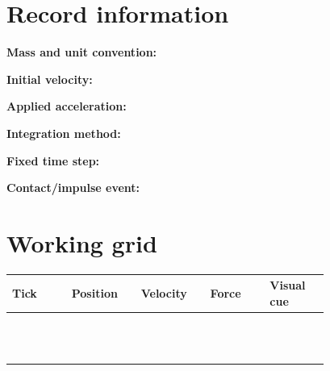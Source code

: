 \documentclass[10pt,letterpaper]{article}
\begin{document}
\makedoctitle
\makedocsummary

\section{Record information}
\noindent\textbf{Mass and unit convention:}\quad\hrulefill\par\vspace{10pt}
\noindent\textbf{Initial velocity:}\quad\hrulefill\par\vspace{10pt}
\noindent\textbf{Applied acceleration:}\quad\hrulefill\par\vspace{10pt}
\noindent\textbf{Integration method:}\quad\hrulefill\par\vspace{10pt}
\noindent\textbf{Fixed time step:}\quad\hrulefill\par\vspace{10pt}
\noindent\textbf{Contact/impulse event:}\quad\hrulefill\par\vspace{10pt}\section{Working grid}
\begin{longtable}{|p{0.156\linewidth}|p{0.156\linewidth}|p{0.156\linewidth}|p{0.156\linewidth}|p{0.156\linewidth}|}
\hline
\textbf{Tick} & \textbf{Position} & \textbf{Velocity} & \textbf{Force} & \textbf{Visual cue}\\\hline
\endhead
\rule{0pt}{20pt} &  &  &  & \\\hline
\rule{0pt}{20pt} &  &  &  & \\\hline
\rule{0pt}{20pt} &  &  &  & \\\hline
\rule{0pt}{20pt} &  &  &  & \\\hline
\rule{0pt}{20pt} &  &  &  & \\\hline
\rule{0pt}{20pt} &  &  &  & \\\hline
\rule{0pt}{20pt} &  &  &  & \\\hline
\rule{0pt}{20pt} &  &  &  & \\\hline
\rule{0pt}{20pt} &  &  &  & \\\hline
\rule{0pt}{20pt} &  &  &  & \\\hline
\rule{0pt}{20pt} &  &  &  & \\\hline
\rule{0pt}{20pt} &  &  &  & \\\hline
\end{longtable}
\end{document}
